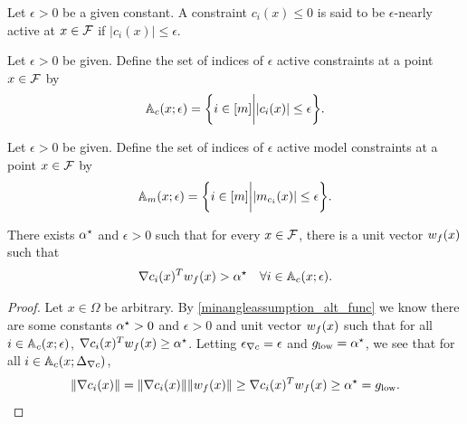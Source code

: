 \begin{definition}
Let $\epsilon > 0$ be a given constant.
A constraint $c_i(x) \le 0$ is said to be $\epsilon$-nearly active at $x \in {\mathcal F}$ if $|c_i(x)| \le \epsilon$.
\end{definition}

\begin{definition}
Let $\epsilon > 0$ be given.
Define the set of indices of $\epsilon$ active constraints at a point $x \in {\mathcal F}$ by
\begin{align}
{\mathbb A_c}(x; \epsilon) = \bigg\{ i \in [m] \bigg | |c_i(x)| \le \epsilon \bigg\}. \label{define_epsactive}
\end{align}
\end{definition}

\begin{definition}
Let $\epsilon > 0$ be given.
Define the set of indices of $\epsilon$ active model constraints at a point $x \in {\mathcal F}$ by
\begin{align}
{\mathbb A_{m}}(x; \epsilon) = \bigg\{ i \in [m] \bigg | |m_{c_i}(x)| \le \epsilon  \bigg\}. \label{define_epsactivemodels}
\end{align}
\end{definition}

\begin{assumption}
\label{minangleassumption_alt_func}
There exists ${ \alpha^{\star} }$ and $\epsilon > 0$ such that for every $x \in {\mathcal F}$, 
there is a unit vector ${w_f}(x)$ such that
\begin{align*}
\nabla c_i(x)^T{w_f}(x) > { \alpha^{\star} }\quad \forall i \in {\mathbb A_c}(x; \epsilon).
\end{align*}
\end{assumption}


\begin{proof}

Let $x \in \Omega$ be arbitrary.
By \cref{minangleassumption_alt_func} we know there are some constants ${ \alpha^{\star} }>0$ and $\epsilon>0$ and unit vector ${w_f}(x)$
such that for all $i \in {\mathbb A_c}(x; \epsilon)$,
$\nabla c_i(x)^T{w_f}(x) \ge { \alpha^{\star} }$.
Letting ${\epsilon_{\nabla c}} = \epsilon$ and ${ g_{\textrm{low}} } = { \alpha^{\star} }$, we see that for all $i \in {\mathbb A_c}(x; {\Delta_{\nabla c}})$,
\begin{align*}
\|\nabla c_i(x)\| = \|\nabla c_i(x)\| \|{w_f}(x)\| \ge \nabla c_i(x)^T{w_f}(x) \ge { \alpha^{\star} } = { g_{\textrm{low}} }.
\end{align*}
\end{proof}

